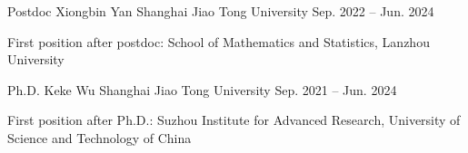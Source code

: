 
\begin{cventries}

  \cventry
  {Postdoc} %
  {Xiongbin Yan} %
  {Shanghai Jiao Tong University} %
  {Sep. 2022 -- Jun. 2024} %
  {
    \begin{cvitems} %
    \item {First position after postdoc: School of Mathematics and Statistics, Lanzhou University}
    \end{cvitems}
  }

  \cventry
  {Ph.D.} %
  {Keke Wu} %
  {Shanghai Jiao Tong University} %
  {Sep. 2021 -- Jun. 2024} %
  {
    \begin{cvitems} %
    \item {First position after Ph.D.: Suzhou Institute for Advanced Research, University of Science and Technology of China}
    \end{cvitems}
  }
\end{cventries}

